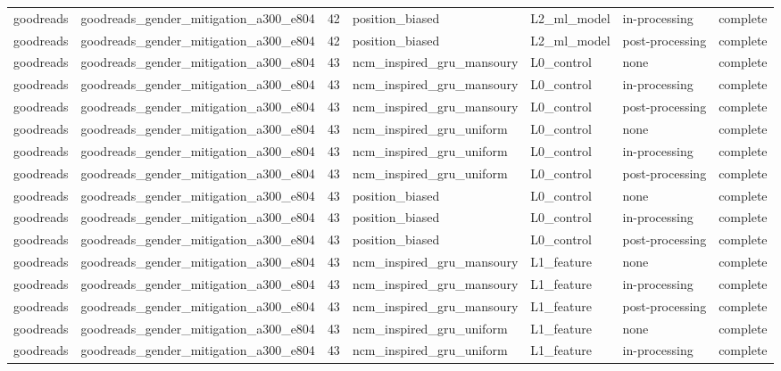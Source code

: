 \begin{table}[htbp!]
\begin{tabular}{llrllll}
goodreads & goodreads\_gender\_mitigation\_a300\_e804 & 42 & position\_biased & L2\_ml\_model & in-processing & complete \\
goodreads & goodreads\_gender\_mitigation\_a300\_e804 & 42 & position\_biased & L2\_ml\_model & post-processing & complete \\
goodreads & goodreads\_gender\_mitigation\_a300\_e804 & 43 & ncm\_inspired\_gru\_mansoury & L0\_control & none & complete \\
goodreads & goodreads\_gender\_mitigation\_a300\_e804 & 43 & ncm\_inspired\_gru\_mansoury & L0\_control & in-processing & complete \\
goodreads & goodreads\_gender\_mitigation\_a300\_e804 & 43 & ncm\_inspired\_gru\_mansoury & L0\_control & post-processing & complete \\
goodreads & goodreads\_gender\_mitigation\_a300\_e804 & 43 & ncm\_inspired\_gru\_uniform & L0\_control & none & complete \\
goodreads & goodreads\_gender\_mitigation\_a300\_e804 & 43 & ncm\_inspired\_gru\_uniform & L0\_control & in-processing & complete \\
goodreads & goodreads\_gender\_mitigation\_a300\_e804 & 43 & ncm\_inspired\_gru\_uniform & L0\_control & post-processing & complete \\
goodreads & goodreads\_gender\_mitigation\_a300\_e804 & 43 & position\_biased & L0\_control & none & complete \\
goodreads & goodreads\_gender\_mitigation\_a300\_e804 & 43 & position\_biased & L0\_control & in-processing & complete \\
goodreads & goodreads\_gender\_mitigation\_a300\_e804 & 43 & position\_biased & L0\_control & post-processing & complete \\
goodreads & goodreads\_gender\_mitigation\_a300\_e804 & 43 & ncm\_inspired\_gru\_mansoury & L1\_feature & none & complete \\
goodreads & goodreads\_gender\_mitigation\_a300\_e804 & 43 & ncm\_inspired\_gru\_mansoury & L1\_feature & in-processing & complete \\
goodreads & goodreads\_gender\_mitigation\_a300\_e804 & 43 & ncm\_inspired\_gru\_mansoury & L1\_feature & post-processing & complete \\
goodreads & goodreads\_gender\_mitigation\_a300\_e804 & 43 & ncm\_inspired\_gru\_uniform & L1\_feature & none & complete \\
goodreads & goodreads\_gender\_mitigation\_a300\_e804 & 43 & ncm\_inspired\_gru\_uniform & L1\_feature & in-processing & complete \\

\end{tabular}
\end{table}
